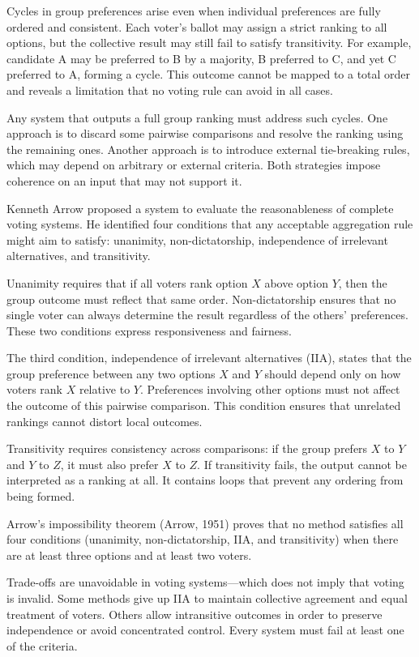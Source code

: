 Cycles in group preferences arise even when individual preferences are fully ordered and consistent. Each voter's ballot may assign a strict ranking to all options, but the collective result may still fail to satisfy transitivity. For example, candidate A may be preferred to B by a majority, B preferred to C, and yet C preferred to A, forming a cycle. This outcome cannot be mapped to a total order and reveals a limitation that no voting rule can avoid in all cases.

Any system that outputs a full group ranking must address such cycles. One approach is to discard some pairwise comparisons and resolve the ranking using the remaining ones. Another approach is to introduce external tie-breaking rules, which may depend on arbitrary or external criteria. Both strategies impose coherence on an input that may not support it.

Kenneth Arrow proposed a system to evaluate the reasonableness of complete voting systems. He identified four conditions that any acceptable aggregation rule might aim to satisfy: unanimity, non-dictatorship, independence of irrelevant alternatives, and transitivity.

Unanimity requires that if all voters rank option $X$ above option $Y$, then the group outcome must reflect that same order. Non-dictatorship ensures that no single voter can always determine the result regardless of the others' preferences. These two conditions express responsiveness and fairness.

The third condition, independence of irrelevant alternatives (IIA), states that the group preference between any two options $X$ and $Y$ should depend only on how voters rank $X$ relative to $Y$. Preferences involving other options must not affect the outcome of this pairwise comparison. This condition ensures that unrelated rankings cannot distort local outcomes.

Transitivity requires consistency across comparisons: if the group prefers $X$ to $Y$ and $Y$ to $Z$, it must also prefer $X$ to $Z$. If transitivity fails, the output cannot be interpreted as a ranking at all. It contains loops that prevent any ordering from being formed. 

Arrow’s impossibility theorem (Arrow, 1951) proves that no method satisfies all four conditions (unanimity, non-dictatorship, IIA, and transitivity) when there are at least three options and at least two voters. 

Trade-offs are unavoidable in voting systems—which does not imply that voting is invalid. Some methods give up IIA to maintain collective agreement and equal treatment of voters. Others allow intransitive outcomes in order to preserve independence or avoid concentrated control. Every system must fail at least one of the criteria.

